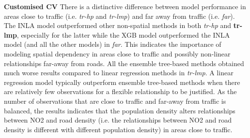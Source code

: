 \documentclass{article}
\begin{document}
\textbf{Customised CV}
There is a distinctive difference between model performance in areas close to traffic (i.e. \textit{tr-hp} and \textit{tr-lmp}) and far away from traffic (i.e. \textit{far}). The INLA model outperformed other non-spatial methods in both \textit{tr-hp} and \textbf{tr-lmp}, especially for the latter while the XGB model outperformed the INLA model (and all the other models) in \textit{far}. This indicates the importance of modeling spatial dependency in areas close to traffic and possibly non-linear relationships far-away from roads. All the ensemble tree-based methods obtained much worse results compared to linear regression methods in \textit{tr-lmp}. A linear regression model typically outperform ensemble tree-based methods when there are relatively few observations for a flexible relationship to be justified. As the number of observations that are close to traffic and far-away from traffic is balanced, the results indicates that the population density alters relationships between NO2 and road density (i.e. the relationships between NO2 and road density is different with different population density) in areas close to traffic. 
\end{document}
